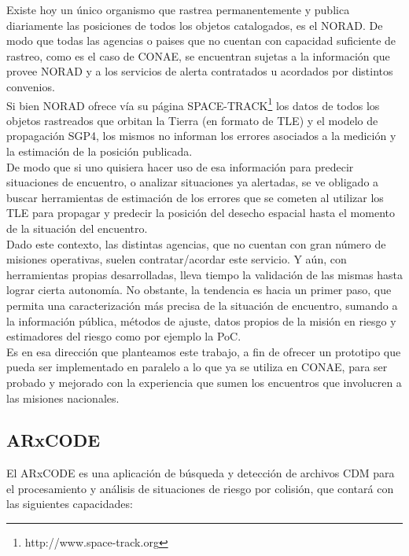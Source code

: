 Existe hoy un \'unico organismo que rastrea permanentemente y publica diariamente las posiciones de todos los objetos catalogados, es el \ac{NORAD}. De modo que todas las agencias o paises que no cuentan con capacidad suficiente de rastreo, como es el caso de CONAE, se encuentran sujetas a la informaci\'on que provee NORAD y a los servicios de alerta contratados u acordados por distintos convenios.\\
Si bien \ac{NORAD} ofrece v\'ia su p\'agina SPACE-TRACK{\footnote{http://www.space-track.org}} los datos de todos los objetos rastreados que orbitan la Tierra (en formato de \ac{TLE}) y el modelo de propagaci\'on \ac{SGP4}, los mismos no informan los errores asociados a la medici\'on y la estimaci\'on de la posici\'on publicada. \\
De modo que si uno quisiera hacer uso de esa informaci\'on para predecir situaciones de encuentro, o analizar situaciones ya alertadas, se ve obligado a buscar herramientas de estimaci\'on de los errores que se cometen al utilizar los TLE para propagar y predecir la posici\'on del desecho espacial hasta el momento de la situaci\'on del encuentro.\\ 

Dado este contexto, las distintas agencias, que no cuentan con gran n\'umero de misiones operativas, suelen contratar/acordar este servicio. Y a\'un, con herramientas propias desarrolladas, lleva tiempo la validaci\'on de las mismas hasta lograr cierta autonom\'ia. No obstante, la tendencia es hacia un primer paso, que permita una caracterizaci\'on m\'as precisa de la situaci\'on de encuentro, sumando a la informaci\'on p\'ublica, m\'etodos de ajuste, datos propios de la misi\'on en riesgo y estimadores del riesgo como por ejemplo la \ac{PoC}.\\
Es en esa direcci\'on que planteamos este trabajo, a fin de ofrecer un prototipo que pueda ser implementado en paralelo a lo que ya se utiliza en CONAE, para ser probado y mejorado con la experiencia que sumen los encuentros que involucren a las misiones nacionales.\\

\subsection*{ARxCODE}
El ARxCODE es una aplicaci\'on de b\'usqueda y detecci\'on de archivos CDM para el procesamiento y an\'alisis de situaciones de riesgo por colisi\'on, que contar\'a con las siguientes capacidades:

